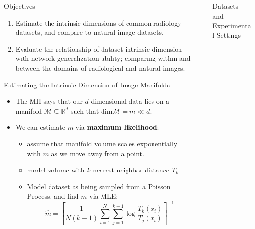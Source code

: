 \documentclass[final,hyperref={pdfpagelabels=false}]{beamer}
\begin{document}
\begin{frame}[t]
\begin{columns}[t]
\begin{column}{.3\textwidth}
\begin{block}{Objectives}
\begin{enumerate}
\item Estimate the intrinsic dimensions of common radiology datasets, and compare to natural image datasets.
\item Evaluate the relationship of dataset intrinsic dimension with network generalization ability; comparing within and between the domains of radiological and natural images.
\end{enumerate}

\end{block}

\begin{block}{Estimating the Intrinsic Dimension of Image Manifolds}
\begin{itemize}
    \item The MH says that our $d$-dimensional data lies on a manifold $\mathcal{M}\subseteq \mathbb{R}^d$ such that $\mathrm{dim}{\mathcal{M}}=m\ll d$.
\item We can estimate $m$ via \textbf{maximum likelihood}:
    \begin{itemize}
        \item assume that manifold volume scales exponentially with $m$ as we move away from a point. 
        \item model volume with $k$-nearest neighbor distance $T_k$.
        \item Model dataset as being sampled from a Poisson Process, and find $m$ via MLE:
        \begin{equation*}
            \label{eq:id_mle}
                \hat{m}=\left[\frac{1}{N(k-1)} \sum_{i=1}^{N} \sum_{j=1}^{k-1} \log \frac{T_{k}\left(x_{i}\right)}{T_{j}\left(x_{i}\right)}\right]^{-1}
        \end{equation*}
    \end{itemize}

\end{itemize}
\end{block}


\end{column} %
\begin{column}{.03\textwidth}\end{column} %

 
\begin{column}{.3\textwidth} %

\begin{block}{Datasets and Experimental Settings}


\end{block}
\end{column}
\end{columns}
\end{frame}
\end{document}
